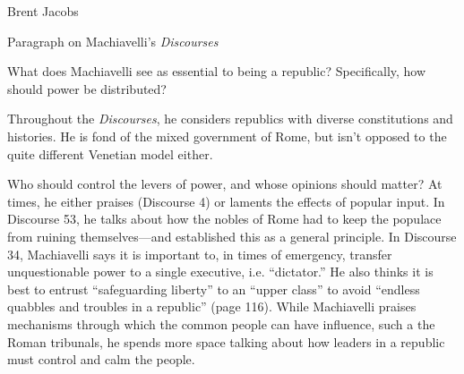 \documentclass[11pt]{article}
\begin{document}
\hfill Brent Jacobs
\begin{center}
Paragraph on Machiavelli's \textsl{Discourses}
\end{center}
What does Machiavelli see as essential to being a republic?
Specifically, how should power be distributed?

Throughout the \textsl{Discourses}, he
considers republics with diverse constitutions and histories.
He is fond of the mixed government of Rome, but isn't opposed to the
quite different Venetian model either.

Who should control the levers of power, and whose opinions should matter?
At times, he either praises (Discourse 4) or laments
the effects of popular input.
In Discourse 53, he talks
about how the nobles of Rome had to keep the populace from ruining
themselves---and established this as a general principle.
In Discourse 34, Machiavelli says it is important to, in times of emergency,
transfer unquestionable power to a single executive, i.e. ``dictator.''
He also thinks it is best to entrust ``safeguarding liberty'' to an
``upper class'' to avoid ``endless quabbles and troubles in a republic''
(page 116).
While Machiavelli praises mechanisms through which the common people
can have influence, such a the Roman tribunals, he spends more space
talking about how leaders in a republic must control and calm the people.
\end{document}
